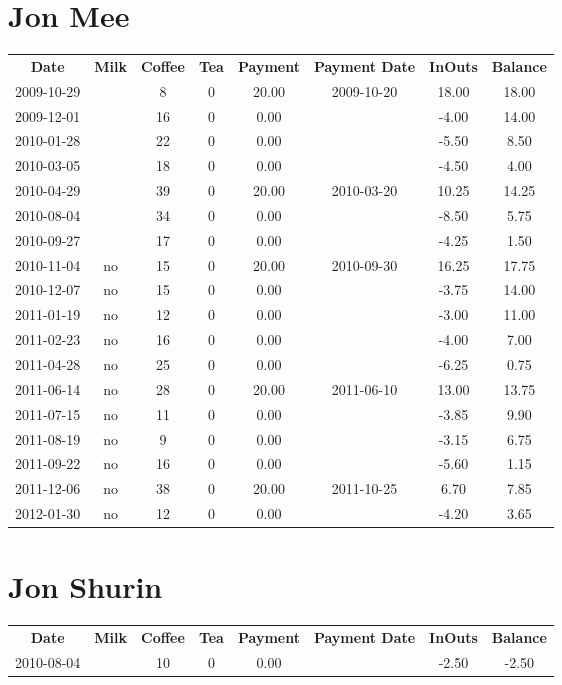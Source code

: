 \section{Jon Mee}

\begin{center}
\begin{tabular}{cccccccc}
\textbf{Date} & \textbf{Milk} & \textbf{Coffee} & \textbf{Tea} & \textbf{Payment} & \textbf{Payment Date} & \textbf{InOuts} & \textbf{Balance} \\
2009-10-29 &  &  8 & 0 & 20.00 & 2009-10-20 & 18.00 & 18.00\\ 
2009-12-01 &  & 16 & 0 &  0.00 &  & -4.00 & 14.00\\ 
2010-01-28 &  & 22 & 0 &  0.00 &  & -5.50 &  8.50\\ 
2010-03-05 &  & 18 & 0 &  0.00 &  & -4.50 &  4.00\\ 
2010-04-29 &  & 39 & 0 & 20.00 & 2010-03-20 & 10.25 & 14.25\\ 
2010-08-04 &  & 34 & 0 &  0.00 &  & -8.50 &  5.75\\ 
2010-09-27 &  & 17 & 0 &  0.00 &  & -4.25 &  1.50\\ 
2010-11-04 & no & 15 & 0 & 20.00 & 2010-09-30 & 16.25 & 17.75\\ 
2010-12-07 & no & 15 & 0 &  0.00 &  & -3.75 & 14.00\\ 
2011-01-19 & no & 12 & 0 &  0.00 &  & -3.00 & 11.00\\ 
2011-02-23 & no & 16 & 0 &  0.00 &  & -4.00 &  7.00\\ 
2011-04-28 & no & 25 & 0 &  0.00 &  & -6.25 &  0.75\\ 
2011-06-14 & no & 28 & 0 & 20.00 & 2011-06-10 & 13.00 & 13.75\\ 
2011-07-15 & no & 11 & 0 &  0.00 &  & -3.85 &  9.90\\ 
2011-08-19 & no &  9 & 0 &  0.00 &  & -3.15 &  6.75\\ 
2011-09-22 & no & 16 & 0 &  0.00 &  & -5.60 &  1.15\\ 
2011-12-06 & no & 38 & 0 & 20.00 & 2011-10-25 &  6.70 &  7.85\\ 
2012-01-30 & no & 12 & 0 &  0.00 &  & -4.20 &  3.65
\end{tabular}
\end{center}

\section{Jon Shurin}

\begin{center}
\begin{tabular}{cccccccc}
\textbf{Date} & \textbf{Milk} & \textbf{Coffee} & \textbf{Tea} & \textbf{Payment} & \textbf{Payment Date} & \textbf{InOuts} & \textbf{Balance} \\
2010-08-04 &  & 10 & 0 & 0.00 &  & -2.50 & -2.50
\end{tabular}
\end{center}


